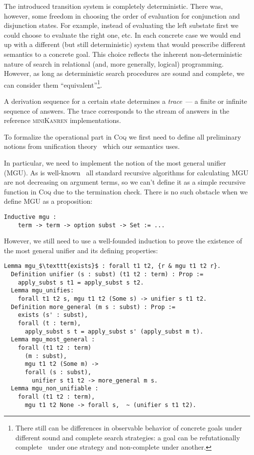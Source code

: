 The introduced transition system is completely deterministic. There was, however, some freedom in choosing the order of evaluation for conjunction and
disjunction states. For example, instead of evaluating the left substate first we could choose to evaluate the right one, etc. In each concrete case we would
end up with a different (but still deterministic) system that would prescribe different semantics to a concrete goal. This choice reflects the inherent
non-deterministic nature of search in relational (and, more generally, logical) programming. However, as long as deterministic search procedures
are sound and complete, we can consider them ``equivalent''\footnote{There still can be differences in observable behavior of concrete goals under different
sound and complete search strategies: a goal can be refutationally complete~\cite{WillThesis} under one strategy and non-complete under another.}.

A derivation sequence for a certain state determines a \emph{trace}~--- a finite or infinite sequence of answers. The trace corresponds to the stream of answers
in the reference \textsc{miniKanren} implementations.

To formalize the operational part in \textsc{Coq} we first need to define all preliminary notions from unification theory~\cite{Unification} which our semantics uses.

In particular, we need to implement the notion of the most general unifier (MGU). As is well-known~\cite{UnificationMcBride} all standard recursive algorithms for calculating
MGU are not decreasing on argument terms, so we can't define it as a simple recursive function in \textsc{Coq} due to the termination check. There is no such obstacle when we define
MGU as a proposition:

\begin{lstlisting}[language=Coq]
  Inductive mgu :
    term -> term -> option subst -> Set := ...
\end{lstlisting}

However, we still need to use a well-founded induction to prove the existence of the most general unifier and its defining properties:

\begin{lstlisting}[language=Coq]
  Lemma mgu_$\texttt{exists}$ : forall t1 t2, {r & mgu t1 t2 r}.
  Definition unifier (s : subst) (t1 t2 : term) : Prop :=
    apply_subst s t1 = apply_subst s t2.
  Lemma mgu_unifies:
    forall t1 t2 s, mgu t1 t2 (Some s) -> unifier s t1 t2.
  Definition more_general (m s : subst) : Prop :=
    exists (s' : subst),
    forall (t : term),
      apply_subst s t = apply_subst s' (apply_subst m t).
  Lemma mgu_most_general :
    forall (t1 t2 : term)
      (m : subst),
      mgu t1 t2 (Some m) ->
      forall (s : subst),
        unifier s t1 t2 -> more_general m s.
  Lemma mgu_non_unifiable :
    forall (t1 t2 : term),
      mgu t1 t2 None -> forall s,  ~ (unifier s t1 t2).
\end{lstlisting}

